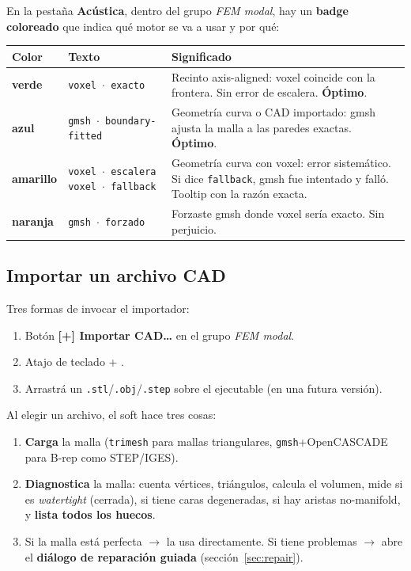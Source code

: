 \documentclass[11pt, a4paper]{article}
\newcommand{\tecla}[1]{\texttt{\small\fbox{#1}}}
\newcommand{\menu}[1]{\textbf{\guillemotleft #1\guillemotright}}
\begin{document}
En la pestaña \textbf{Acústica}, dentro del grupo \textit{FEM modal}, hay un
\textbf{badge coloreado} que indica qué motor se va a usar y por qué:

\vspace{0.4em}
\begin{tabular}{p{1.4cm}p{4.5cm}p{8.5cm}}
  \toprule
  \textbf{Color} & \textbf{Texto} & \textbf{Significado} \\
  \midrule
  \textcolor{green!50!black}{\textbf{verde}}
    & \texttt{voxel $\cdot$ exacto}
    & Recinto axis-aligned: voxel coincide con la frontera. Sin error de
      escalera. \textbf{Óptimo}. \\
  \textcolor{blue!60!black}{\textbf{azul}}
    & \texttt{gmsh $\cdot$ boundary-fitted}
    & Geometría curva o CAD importado: gmsh ajusta la malla a las paredes
      exactas. \textbf{Óptimo}. \\
  \textcolor{orange!70!black}{\textbf{amarillo}}
    & \texttt{voxel $\cdot$ escalera} \newline
      \texttt{voxel $\cdot$ fallback}
    & Geometría curva con voxel: error sistemático. Si dice
      \texttt{fallback}, gmsh fue intentado y falló. Tooltip con la razón
      exacta. \\
  \textcolor{cOrange}{\textbf{naranja}}
    & \texttt{gmsh $\cdot$ forzado}
    & Forzaste gmsh donde voxel sería exacto. Sin perjuicio. \\
  \bottomrule
\end{tabular}

\subsection{Importar un archivo CAD}

Tres formas de invocar el importador:

\begin{enumerate}[itemsep=2pt]
  \item Botón \menu{\textbf{[+]} Importar CAD\ldots} en el grupo \textit{FEM modal}.
  \item Atajo de teclado \tecla{Ctrl} + \tecla{I}.
  \item Arrastrá un \texttt{.stl}/\texttt{.obj}/\texttt{.step} sobre el
        ejecutable (en una futura versión).
\end{enumerate}

Al elegir un archivo, el soft hace tres cosas:

\begin{enumerate}[itemsep=2pt]
  \item \textbf{Carga} la malla (\texttt{trimesh} para mallas triangulares,
        \texttt{gmsh}+OpenCASCADE para B-rep como STEP/IGES).
  \item \textbf{Diagnostica} la malla: cuenta vértices, triángulos, calcula
        el volumen, mide si es \textit{watertight} (cerrada), si tiene caras
        degeneradas, si hay aristas no-manifold, y \textbf{lista todos los
        huecos}.
  \item Si la malla está perfecta $\to$ la usa directamente. Si tiene
        problemas $\to$ abre el \textbf{diálogo de reparación guiada}
        (sección~\ref{sec:repair}).
\end{enumerate}
\end{document}
